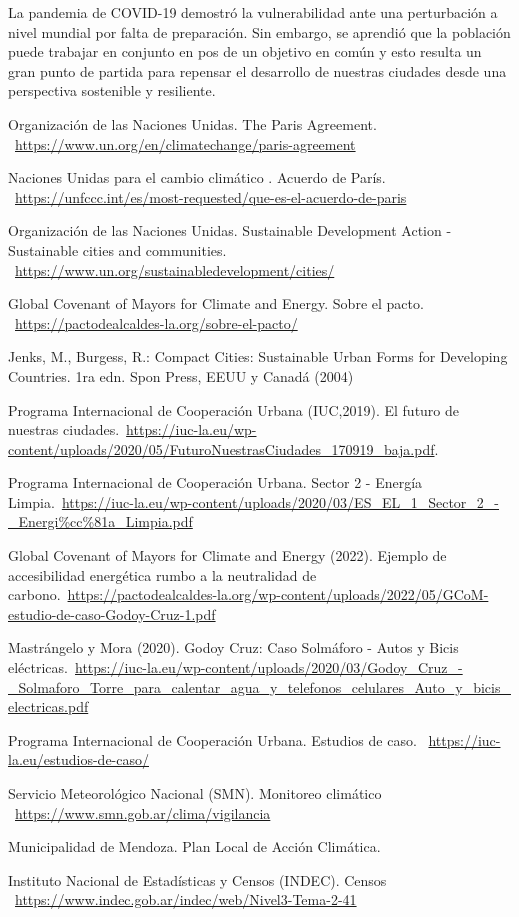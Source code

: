 \documentclass[runningheads]{llncs}
\begin{document}
La pandemia de COVID-19 demostró la vulnerabilidad ante una perturbación a nivel mundial por falta de preparación. Sin embargo, se aprendió que la población puede trabajar en conjunto en pos de un objetivo en común y esto resulta un gran punto de partida para repensar el desarrollo de nuestras ciudades desde una perspectiva sostenible y resiliente.


\begin{thebibliography}{8}

Organización de las Naciones Unidas. The Paris Agreement. ~\url{https://www.un.org/en/climatechange/paris-agreement}

Naciones Unidas para el cambio climático . Acuerdo de París. ~\url{https://unfccc.int/es/most-requested/que-es-el-acuerdo-de-paris}

Organización de las Naciones Unidas. Sustainable Development Action - Sustainable cities and communities. ~\url{https://www.un.org/sustainabledevelopment/cities/}

Global Covenant of Mayors for Climate and Energy. Sobre el pacto. ~\url{https://pactodealcaldes-la.org/sobre-el-pacto/}

Jenks, M., Burgess, R.: Compact Cities: Sustainable Urban Forms for Developing Countries. 1ra edn. Spon Press, EEUU y Canadá (2004)


Programa Internacional de Cooperación Urbana (IUC,2019). El futuro de nuestras ciudades.~\url{https://iuc-la.eu/wp-content/uploads/2020/05/FuturoNuestrasCiudades\_170919\_baja.pdf}.


Programa Internacional de Cooperación Urbana. Sector 2 - Energía Limpia.~\url{https://iuc-la.eu/wp-content/uploads/2020/03/ES\_EL\_1\_Sector\_2\_-\_Energi\%cc\%81a\_Limpia.pdf}


Global Covenant of Mayors for Climate and Energy (2022). Ejemplo de accesibilidad energética rumbo a la neutralidad de carbono.~\url{https://pactodealcaldes-la.org/wp-content/uploads/2022/05/GCoM-estudio-de-caso-Godoy-Cruz-1.pdf}

Mastrángelo y Mora (2020). Godoy Cruz: Caso Solmáforo - Autos y Bicis eléctricas.~\url{https://iuc-la.eu/wp-content/uploads/2020/03/Godoy\_Cruz\_-\_Solmaforo\_Torre\_para\_calentar\_agua\_y\_telefonos\_celulares\_Auto\_y\_bicis\_electricas.pdf}

Programa Internacional de Cooperación Urbana. Estudios de caso. ~\url{https://iuc-la.eu/estudios-de-caso/}

Servicio Meteorológico Nacional (SMN). Monitoreo climático ~\url{https://www.smn.gob.ar/clima/vigilancia}

Municipalidad de Mendoza. Plan Local de Acción Climática. 

Instituto Nacional de Estadísticas y Censos (INDEC). Censos ~\url{https://www.indec.gob.ar/indec/web/Nivel3-Tema-2-41}


\end{thebibliography}
\end{document}
